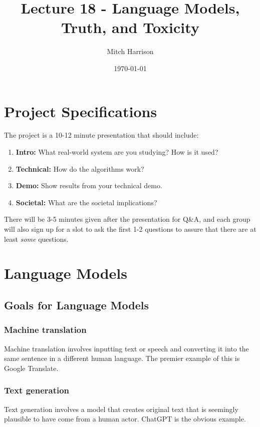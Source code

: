 \documentclass[titlepage, 12pt, leqno]{article}
\title{\Huge{Lecture 18 - Language Models, Truth, and Toxicity}}
\author{\large{Mitch Harrison}}
\date{\today}
\begin{document}
\setlength{\parskip}{1\baselineskip}
\setlength{\parindent}{15pt}
\maketitle
\tableofcontents
\newpage


\section{Project Specifications}
The project is a 10-12 minute presentation that should include:
\begin{enumerate}
    \item \textbf{Intro:} What real-world system are you studying? How is it
        used?
    \item \textbf{Technical:} How do the algorithms work?
    \item \textbf{Demo:} Show results from your technical demo.
    \item \textbf{Societal:} What are the societal implications?
\end{enumerate}

There will be 3-5 minutes given after the presentation for Q\&A, and each group
will also sign up for a slot to ask the first 1-2 questions to assure that 
there are at least \textit{some} questions.

\pagebreak
\section{Language Models}

\subsection{Goals for Language Models}

\subsubsection{Machine translation}
Machine translation involves inputting text or speech and converting it into the
same sentence in a different human language. The premier example of this is
Google Translate.

\subsubsection{Text generation}
Text generation involves a model that creates original text that is seemingly
plausible to have come from a human actor. ChatGPT is the obvious example.
\end{document}
